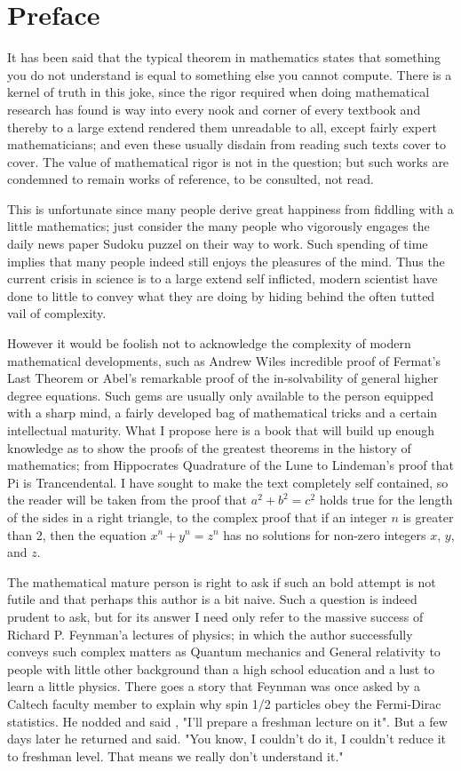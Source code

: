 \chapter{Preface} 
It has been said that the typical theorem in mathematics states that something you do not understand is equal to something else
you cannot compute. There is a kernel of truth in this joke, since the rigor required when doing mathematical research has found
is way into every nook and corner of every textbook and thereby to a large extend rendered them unreadable to all, except fairly
expert mathematicians; and even these usually disdain from reading such texts cover to cover. The value of mathematical rigor is
not in the question; but such works are condemned to remain works of reference, to be consulted, not read.

This is unfortunate since many people derive great happiness from fiddling with a little mathematics; just consider the many
people who vigorously engages the daily news paper Sudoku puzzel on their way to work. Such spending of time implies that many
people indeed still enjoys the pleasures of the mind. Thus the current crisis in science is to a large extend self inflicted,
modern scientist have done to little to convey what they are doing by hiding behind the often tutted vail of complexity.

However it would be foolish not to acknowledge the complexity of modern mathematical developments, such as Andrew Wiles incredible
proof  of Fermat's Last Theorem or Abel's remarkable proof of the in-solvability of general higher degree equations. Such gems are
usually only available to the person equipped with a sharp mind, a fairly developed bag of mathematical tricks and a certain
intellectual maturity. What I propose here is a book that will build  up enough knowledge as to show the proofs of the greatest
theorems in the history of mathematics;  from Hippocrates Quadrature of the Lune to Lindeman's proof that Pi is Trancendental. I
have sought to make the text completely self contained, so the reader will be taken from the proof that $a^2 + b^2 = c^2$ holds
true for the length of the sides in a right triangle, to the complex proof that if an integer $n$ is greater than 2, then the
equation $x^n + y^n = z^n$ has no solutions for non-zero integers $x$, $y$, and $z$. 

The mathematical mature person is right to ask if such an bold attempt is not futile and that perhaps this author is a bit naive.
Such a question is indeed prudent to ask, but for its answer I need only refer to the massive success of Richard P. Feynman'a
lectures of physics; in which the author successfully conveys such complex matters as Quantum mechanics and General relativity to
people with little other background than a high school education and a lust to learn a little physics. There goes a story that
Feynman was once asked by a Caltech faculty member to explain why spin 1/2 particles obey the Fermi-Dirac statistics. He nodded
and said , "I'll prepare a freshman lecture on it". But a few days later he returned and said. "You know, I couldn't do it, I
couldn't reduce it to freshman level. That means we really don't understand it." 

